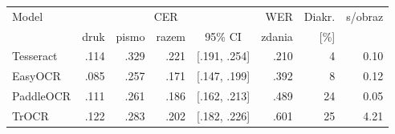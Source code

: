 \begin{tabular}{lrrrcrrr}
\toprule
Model & \multicolumn{4}{c}{CER} & WER & Diakr. & s/obraz \\
 & druk & pismo & razem & 95\% CI & zdania & [\%] & \\
\midrule
Tesseract & .114 & .329 & .221 & [.191, .254] & .210 & 4 & 0.10 \\
EasyOCR & .085 & .257 & .171 & [.147, .199] & .392 & 8 & 0.12 \\
PaddleOCR & .111 & .261 & .186 & [.162, .213] & .489 & 24 & 0.05 \\
TrOCR & .122 & .283 & .202 & [.182, .226] & .601 & 25 & 4.21 \\
\bottomrule
\end{tabular}
